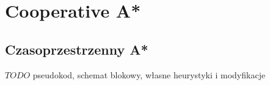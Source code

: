 \chapter{Cooperative A*}
\label{ch:ca}

\section{Czasoprzestrzenny A*}
$TODO$ pseudokod, schemat blokowy, własne heurystyki i modyfikacje
